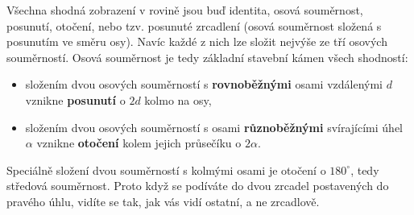 \begin{center}
\end{center}

\begin{note}
  Všechna shodná zobrazení v rovině jsou buď identita, osová souměrnost, posunutí, otočení, nebo tzv. posunuté zrcadlení (osová souměrnost složená s posunutím ve směru osy). Navíc každé z nich lze složit nejvýše ze tří osových souměrností. Osová souměrnost je tedy základní stavební kámen všech shodností:
  \begin{itemize}
    \item složením dvou osových souměrností s \textbf{rovnoběžnými} osami vzdálenými $d$ vznikne \textbf{posunutí} o $2d$ kolmo na osy,
    \item složením dvou osových souměrností s osami \textbf{různoběžnými} svírajícími úhel $\alpha$ vznikne \textbf{otočení} kolem jejich průsečíku o $2\alpha$.
  \end{itemize}
  Speciálně složení dvou souměrností s kolmými osami je otočení o $180^\circ$, tedy středová souměrnost. Proto když se podíváte do dvou zrcadel postavených do pravého úhlu, vidíte se tak, jak vás vidí ostatní, a ne zrcadlově.
\end{note}

